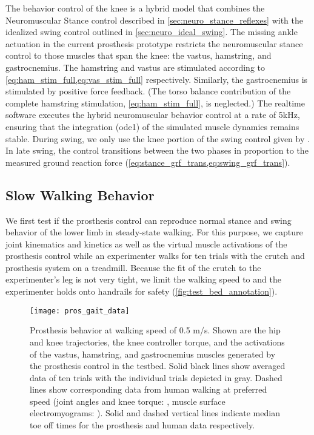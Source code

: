 The behavior control of the knee is a hybrid model that combines the
Neuromuscular Stance control described in \cref{sec:neuro_stance_reflexes} with
the idealized swing control outlined in \cref{sec:neuro_ideal_swing}. The
missing ankle actuation in the current prosthesis prototype restricts the
neuromuscular stance control to those muscles that span the knee: the vastus,
hamstring, and gastrocnemius. The hamstring and vastus are stimulated according
to \cref{eq:ham_stim_full,eq:vas_stim_full} respectively.  Similarly, the
gastrocnemius is stimulated by positive force feedback. (The torso balance
contribution of the complete hamstring stimulation, \cref{eq:ham_stim_full}, is
neglected.) The realtime software executes the hybrid neuromuscular behavior
control at a rate of 5kHz, ensuring that the integration (ode1) of the simulated
muscle dynamics remains stable. During swing, we only use the knee portion of
the swing control given by . In late swing,
the control transitions between the two phases in proportion to the measured
ground reaction force (\cref{eq:stance_grf_trans,eq:swing_grf_trans}).

\subsection{Slow Walking Behavior}
We first test if the prosthesis control can reproduce normal stance and swing
behavior of the lower limb in steady-state walking. For this purpose, we capture
joint kinematics and kinetics as well as the virtual muscle activations of the
prosthesis control while an experimenter walks for ten trials with the crutch
and prosthesis system on a treadmill. Because the fit of the crutch to the
experimenter's leg is not very tight, we limit the walking speed to
 and the experimenter holds onto handrails for safety
(\cref{fig:test_bed_annotation}).
\begin{figure}[t]
    \centering
    \texttt{[image: pros\_gait\_data]}
    \caption{Prosthesis behavior at walking speed of 0.5 m/s. Shown are the hip
    and knee trajectories, the knee controller torque, and the activations of
    the vastus, hamstring, and gastrocnemius muscles generated by the
    prosthesis control in the testbed. Solid black lines show averaged data  of
    ten trials with the individual trials depicted in gray. Dashed lines show
    corresponding data from human walking at preferred speed (joint angles and
    knee torque: \citet{winter2009biomechanics}, muscle surface
    electromyograms: \citet{perry2010gait}). Solid and dashed vertical lines
    indicate median toe off times for the prosthesis and human data
    respectively.
    }\label{fig:pros_gait_data}
\end{figure}

